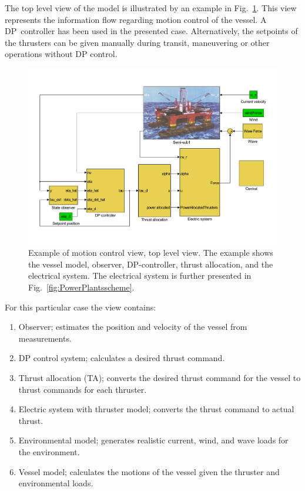 \documentclass[twocolumn,10pt]{asme2e}
\begin{document}
The top level view of the model is illustrated by an example in Fig.~\ref{fig:DPscheme}.
This view represents the information flow regarding motion control of the vessel.
A DP~controller has been used in the presented case.
Alternatively, the setpoints of the thrusters can be given manually during transit, maneuvering or other operations without DP control.
\begin{figure}[t!]
\normalsize
\centering
\includegraphics[trim=30 60 30 60,width=.7\textwidth,clip]{./figures/DPscheme}
\caption{Example of motion control view, top level view. 
The example shows the vessel model, observer, DP-controller, thrust allocation, and the electrical system.
The electrical system is further presented in Fig.~\ref{fig:PowerPlantsscheme}.}
\label{fig:DPscheme}
\end{figure}

For this particular case the view contains:\begin{enumerate}
\item Observer; estimates the position and velocity of the vessel from measurements.
\item DP control system; calculates a desired thrust command.
\item Thrust allocation (TA); converts the desired thrust command for the vessel to thrust commands for each thruster.
\item Electric system with thruster model; converts the thrust command to actual thrust.
\item Environmental model; generates realistic current, wind, and wave loads for the environment.
\item Vessel model; calculates the motions of the vessel given the thruster and environmental loads.
\end{enumerate} 
\end{document}
